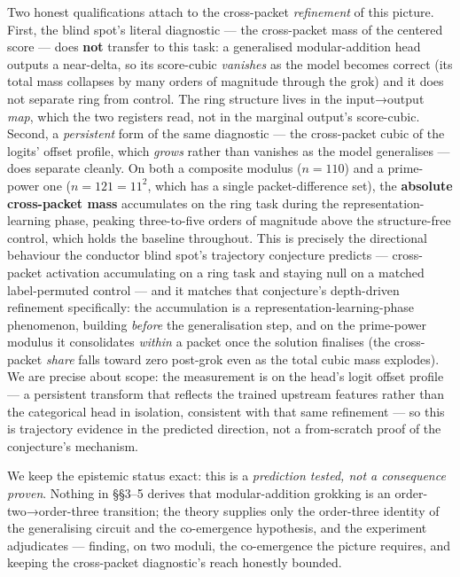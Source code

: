 \documentclass[
  letterpaper,
  11pt]{article}
\theoremstyle{plain}
\theoremstyle{definition}
\theoremstyle{remark}
\begin{document}
Two honest qualifications attach to the cross-packet \emph{refinement} of this picture. First, the blind spot's literal diagnostic --- the cross-packet mass of the centered score --- does \textbf{not} transfer to this task: a generalised modular-addition head outputs a near-delta, so its score-cubic \emph{vanishes} as the model becomes correct (its total mass collapses by many orders of magnitude through the grok) and it does not separate ring from control. The ring structure lives in the input→output \emph{map}, which the two registers read, not in the marginal output's score-cubic. Second, a \emph{persistent} form of the same diagnostic --- the cross-packet cubic of the logits' offset profile, which \emph{grows} rather than vanishes as the model generalises --- does separate cleanly. On both a composite modulus (\(n=110\)) and a prime-power one (\(n=121=11^2\), which has a single packet-difference set), the \textbf{absolute cross-packet mass} accumulates on the ring task during the representation-learning phase, peaking three-to-five orders of magnitude above the structure-free control, which holds the baseline throughout. This is precisely the directional behaviour the conductor blind spot's trajectory conjecture predicts --- cross-packet activation accumulating on a ring task and staying null on a matched label-permuted control --- and it matches that conjecture's depth-driven refinement specifically: the accumulation is a representation-learning-phase phenomenon, building \emph{before} the generalisation step, and on the prime-power modulus it consolidates \emph{within} a packet once the solution finalises (the cross-packet \emph{share} falls toward zero post-grok even as the total cubic mass explodes). We are precise about scope: the measurement is on the head's logit offset profile --- a persistent transform that reflects the trained upstream features rather than the categorical head in isolation, consistent with that same refinement --- so this is trajectory evidence in the predicted direction, not a from-scratch proof of the conjecture's mechanism.

We keep the epistemic status exact: this is a \emph{prediction tested, not a consequence proven}. Nothing in §§3--5 derives that modular-addition grokking is an order-two→order-three transition; the theory supplies only the order-three identity of the generalising circuit and the co-emergence hypothesis, and the experiment adjudicates --- finding, on two moduli, the co-emergence the picture requires, and keeping the cross-packet diagnostic's reach honestly bounded.
\end{document}
